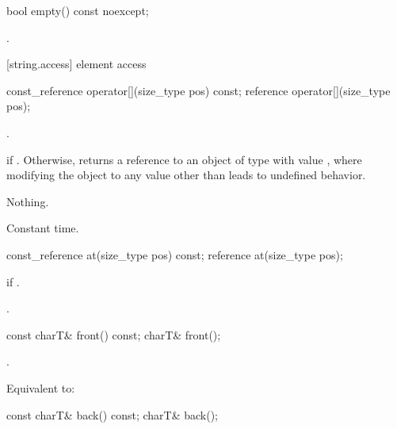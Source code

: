 %
\begin{itemdecl}
bool empty() const noexcept;
\end{itemdecl}

\begin{itemdescr}
\pnum
\returns
{}.
\end{itemdescr}

[string.access]{ element access}

%
\begin{itemdecl}
const_reference operator[](size_type pos) const;
reference       operator[](size_type pos);
\end{itemdecl}

\begin{itemdescr}
\pnum
\requires {}.

\pnum
\returns {} if . Otherwise,
returns a reference to an object of type  with value
, where modifying the object to any value other than
 leads to undefined behavior.

\pnum
\throws Nothing.

\pnum
\complexity Constant time.
\end{itemdescr}

%
\begin{itemdecl}
const_reference at(size_type pos) const;
reference       at(size_type pos);
\end{itemdecl}

\begin{itemdescr}
\pnum
\throws
{}
if
.

\pnum
\returns
{}.
\end{itemdescr}

%
\begin{itemdecl}
const charT& front() const;
charT& front();
\end{itemdecl}

\begin{itemdescr}
\pnum
\requires
{}.

\pnum
\effects
Equivalent to: 
\end{itemdescr}

%
\begin{itemdecl}
const charT& back() const;
charT& back();
\end{itemdecl}


